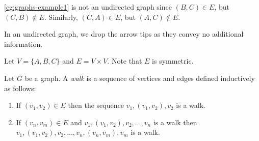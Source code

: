\documentclass{amsart}
\begin{document}
\begin{rmk}
  \label{rmk:example1-not-undirected}
  \cref{eg:graphs-example1} is not an undirected graph since $(B,C) \in E$, but $(C,B) \notin E$.
  Similarly, $(C,A) \in E$, but $(A,C) \notin E$.
\end{rmk}

\begin{rmk}
  \label{rmk:drop-arrows-in-undirected-graphs}
  In an undirected graph, we drop the arrow tips as they convey no additional information.
\end{rmk}

\begin{eg}
  \label{eg:graphs-example2}
  Let $V = \{A, B, C\}$ and $E = V \times V$.
  Note that $E$ is symmetric.
  \begin{center}
  \end{center}
\end{eg}

\begin{defn}
  Let $G$ be a graph.
  A \emph{walk} is a sequence of vertices and edges defined inductively as follows:
  \begin{enumerate}
  \item If $(v_{1},v_{2}) \in E$ then the sequence $v_{1},(v_{1},v_{2}),v_{2}$ is a walk.
  \item If $(v_{n}, v_{m}) \in E$ and $v_{1},(v_{1},v_{2}),v_{2},\ldots,v_{n}$ is a walk then $v_{1},(v_{1},v_{2}),v_{2},\ldots,v_{n},(v_{n},v_{m}),v_{m}$ is a walk.
  \end{enumerate}
\end{defn}
\end{document}
